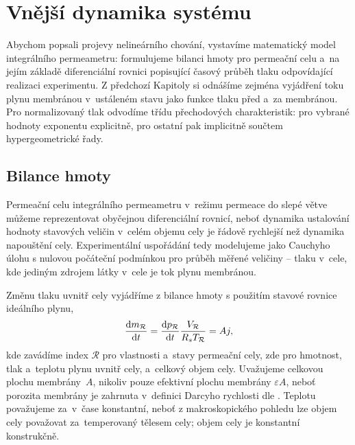 \section{Vnější dynamika systému}\label{s:vnejsi_dynamika_systemu}
Abychom popsali projevy nelineárního chování, vystavíme matematický model integrálního permeametru: formulujeme bilanci hmoty pro permeační celu a~na jejím základě diferenciální rovnici popisující časový průběh tlaku odpovídající realizaci experimentu. Z předchozí Kapitoly si odnášíme zejména vyjádření toku plynu membránou v~ustáleném stavu jako funkce tlaku před a~za membránou. Pro normalizovaný tlak odvodíme třídu přechodových charakteristik: pro vybrané hodnoty exponentu explicitně, pro ostatní pak implicitně součtem hypergeometrické řady.

\subsection{Bilance hmoty}\label{ss:bilance_hmoty}
Permeační celu integrálního permeametru v~režimu permeace do slepé větve  můžeme reprezentovat obyčejnou diferenciální rovnicí, neboť dynamika ustalování hodnoty stavových veličin v~celém objemu cely je řádově rychlejší než dynamika napouštění cely. Experimentální uspořádání tedy modelujeme jako Cauchyho úlohu s nulovou počáteční podmínkou pro průběh měřené veličiny -- tlaku v~cele, kde jediným zdrojem látky v~cele je tok plynu membránou.

Změnu tlaku uvnitř cely vyjádříme z bilance hmoty s použitím stavové rovnice ideálního plynu,
\begin{equation}
    \frac{\mathrm{d} m_{\mathcal{R}}}{\mathrm{d} t}=\frac{\mathrm{d} p_{\mathcal{R}}}{\mathrm{d} t}\frac{V_{\mathcal{R}}}{R_s T_{\mathcal{R}}}=Aj,
\end{equation}
kde zavádíme index $\mathcal{R}$  pro vlastnosti a~stavy permeační cely, zde  pro hmotnost, tlak a~teplotu plynu uvnitř cely, a~celkový objem cely. Uvažujeme celkovou plochu membrány~$A$, nikoliv pouze efektivní plochu membrány $\varepsilon A$, neboť porozita membrány je zahrnuta v~definici Darcyho rychlosti dle . Teplotu považujeme za~v~čase konstantní, neboť z makroskopického pohledu lze objem cely považovat za~temperovaný tělesem cely; objem cely je konstantní konstrukčně.

